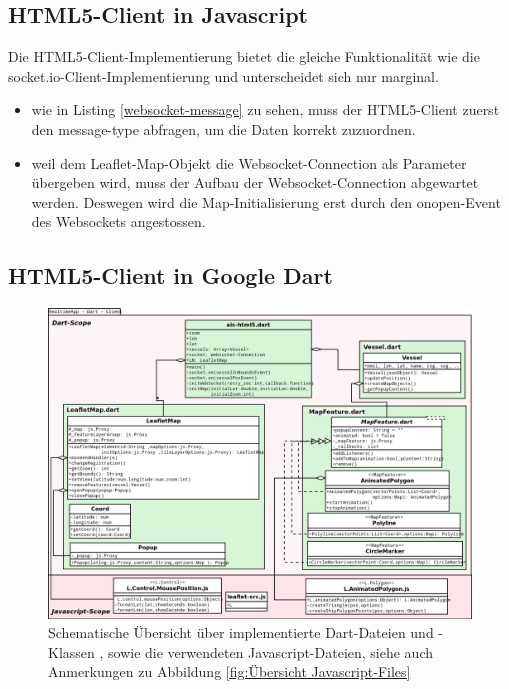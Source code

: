 \subsection{HTML5-Client in Javascript}\label{HTML5-Client in Javascript}
Die HTML5-Client-Implementierung bietet die gleiche Funktionalität wie die socket.io-Client-Implementierung und unterscheidet sich nur marginal.
 \begin{itemize}
 \item wie in Listing \ref{websocket-message} zu sehen, muss der HTML5-Client zuerst den message-type abfragen, um die Daten korrekt zuzuordnen.
 \item weil dem Leaflet-Map-Objekt die Websocket-Connection als Parameter übergeben wird, muss der Aufbau der Websocket-Connection abgewartet werden. Deswegen wird die Map-Initialisierung erst durch den onopen-Event des Websockets angestossen.
\end{itemize}
\subsection{HTML5-Client in Google Dart}\label{HTML5-Client in Google Dart}

\begin{figure}[H]
  \centering
  \includegraphics[width=6.2in]{images/Dart-DateienUndKlassen.png}
  \caption[Übersicht über implementierte Dart-Dateien und -Klassen]{Schematische Übersicht über implementierte Dart-Dateien und -Klassen , sowie die verwendeten Javascript-Dateien, siehe auch Anmerkungen zu Abbildung \ref{fig:Übersicht Javascript-Files}}
  \label{fig:Übersicht Dart-Files}
\end{figure}




